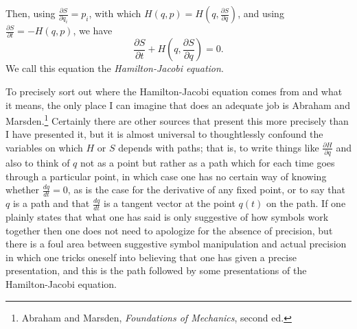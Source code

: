 \documentclass{article}
\theoremstyle{definition}
\begin{document}
Then, using $\frac{\partial S}{\partial q_i}=p_i$,  with which $H(q,p)=H\left(q,\frac{\partial S}{\partial q} \right)$, and using $\frac{\partial S}{\partial t}=-H(q,p)$,
we have
\[
\frac{\partial S}{\partial t}+H\left(q,\frac{\partial S}{\partial q}\right)=0.
\]
We call this equation the {\em Hamilton-Jacobi equation}.

To precisely sort out where the Hamilton-Jacobi equation comes from and what it means, the only place
I can imagine that does an adequate job is Abraham and Marsden.\footnote{Abraham and Marsden, {\em Foundations of Mechanics},
second ed.} Certainly there are other sources that
present this more precisely than I have presented it, but it is almost universal to thoughtlessly confound 
the variables on which $H$ or $S$ depends with paths; that is, to write things like $\frac{\partial H}{\partial q}$ and
also to think of $q$ not as a point but rather as a path which for each time goes through a particular point, in which case
one has no certain way of knowing whether $\frac{dq}{dt}=0$, as is the case for the derivative of any fixed point, or to say
that $q$ is a path and that $\frac{dq}{dt}$ is a tangent vector at the point $q(t)$ on the path.
If one plainly states that what one has said is only suggestive of how symbols work together then one does not
need to apologize for the absence of precision, but there is a foul area between suggestive symbol manipulation and
actual precision in which
one tricks oneself into believing that one has given a precise presentation, and this is the path followed by
 some presentations
of the Hamilton-Jacobi equation.
\end{document}
